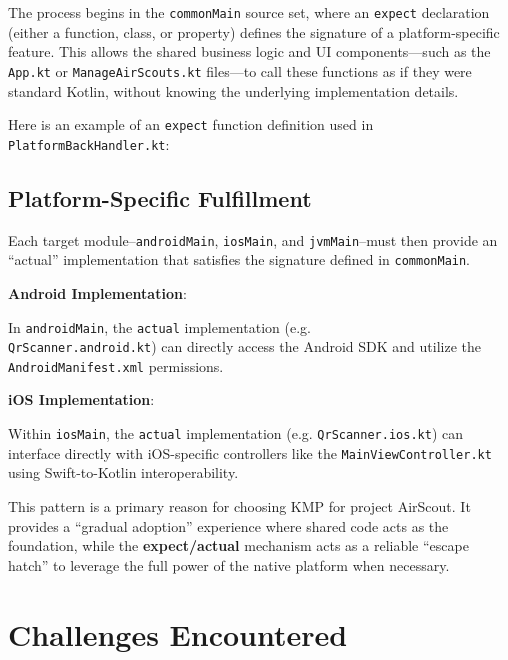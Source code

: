 The process begins in the \texttt{commonMain} source set, where an
\texttt{expect} declaration (either a function, class, or property) defines the
signature of a platform-specific feature. This allows the shared business logic
and UI components—such as the \texttt{App.kt} or \texttt{ManageAirScouts.kt}
files—to call these functions as if they were standard Kotlin, without knowing
the underlying implementation details.

Here is an example of an \texttt{expect} function definition used in \\
\texttt{PlatformBackHandler.kt}: 

\subsection{Platform-Specific Fulfillment}

Each target module--\texttt{androidMain}, \texttt{iosMain}, and
\texttt{jvmMain}--must then provide an ``actual'' implementation that
satisfies the signature defined in \texttt{commonMain}.

\textbf{Android Implementation}:

In \texttt{androidMain}, the \texttt{actual} implementation (e.g.
\\\texttt{QrScanner.android.kt}) can directly access the Android SDK and
utilize the \\\texttt{AndroidManifest.xml} permissions.

\clearpage
\textbf{iOS Implementation}:

Within \texttt{iosMain}, the \texttt{actual} implementation (e.g.
\texttt{QrScanner.ios.kt}) can interface directly with iOS-specific controllers
like the \texttt{MainViewController.kt} using Swift-to-Kotlin interoperability.

This pattern is a primary reason for choosing KMP for project AirScout. It
provides a ``gradual adoption'' experience where shared code acts as the
foundation, while the \textbf{expect/actual} mechanism acts as a reliable
``escape hatch'' to leverage the full power of the native platform when
necessary.

\section{Challenges Encountered}

